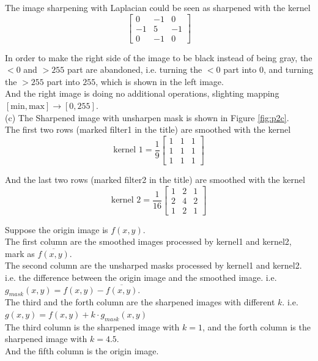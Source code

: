 The image sharpening with Laplacian could be seen as sharpened with the kernel
$$
\begin{bmatrix}
    0 & -1 & 0 \\
    -1 & 5 & -1 \\
    0 & -1 & 0
\end{bmatrix}
$$

In order to make the right side of the image to be black instead of being gray, the $<0$ and $>255$ part are abandoned, i.e. turning the $<0$ part into $0$, and turning the $>255$ part into $255$,
which is shown in the left image.\\
And the right image is doing no additional operations, slighting mapping $[\text{min},\text{max}]\to[0,255]$.\\

(c) The Sharpened image with unsharpen mask is shown in Figure \ref{fig:p2c}.\\
The first two rows (marked filter1 in the title) are smoothed with the kernel 
$$\text{kernel\ 1}=\dfrac{1}{9}\begin{bmatrix}1 & 1 & 1\\1 & 1 & 1\\1 & 1 & 1\end{bmatrix}$$

And the last two rows (marked filter2 in the title) are smoothed with the kernel
$$\text{kernel\ 2}=\dfrac{1}{16}\begin{bmatrix}1 & 2 & 1\\2 & 4 & 2\\1 & 2 & 1\end{bmatrix}$$

Suppose the origin image is $f(x,y)$.\\
The first column are the smoothed images processed by kernel1 and kernel2, mark as $\overline{f(x,y)}$.\\
The second column are the unsharped masks processed by kernel1 and kernel2. i.e. the difference between the
origin image and the smoothed image. i.e. $g_{mask}(x,y)=f(x,y)-\overline{f(x,y)}$.\\
The third and the forth column are the sharpened images with different $k$. i.e. $g(x,y)=f(x,y)+k\cdot g_{mask}(x,y)$\\
The third column is the sharpened image with $k=1$, and the forth column is the sharpened image with $k=4.5$.\\
And the fifth column is the origin image.\\

